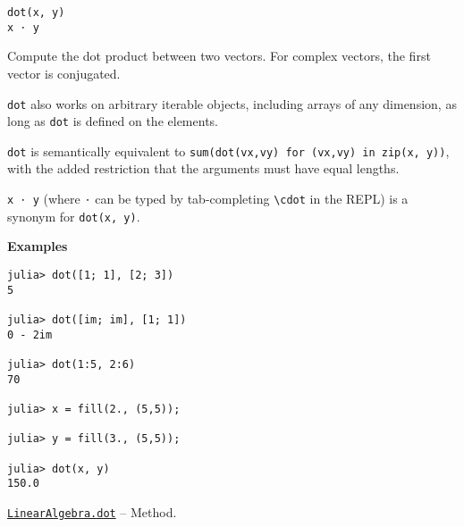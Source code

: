 \begin{adjustwidth}{2em}{0pt}


\begin{verbatim}
dot(x, y)
x ⋅ y
\end{verbatim}

Compute the dot product between two vectors. For complex vectors, the first vector is conjugated.

\texttt{dot} also works on arbitrary iterable objects, including arrays of any dimension, as long as \texttt{dot} is defined on the elements.

\texttt{dot} is semantically equivalent to \texttt{sum(dot(vx,vy) for (vx,vy) in zip(x, y))}, with the added restriction that the arguments must have equal lengths.

\texttt{x ⋅ y} (where \texttt{⋅} can be typed by tab-completing \texttt{{\textbackslash}cdot} in the REPL) is a synonym for \texttt{dot(x, y)}.

\textbf{Examples}


\begin{verbatim}
julia> dot([1; 1], [2; 3])
5

julia> dot([im; im], [1; 1])
0 - 2im

julia> dot(1:5, 2:6)
70

julia> x = fill(2., (5,5));

julia> y = fill(3., (5,5));

julia> dot(x, y)
150.0
\end{verbatim}



\end{adjustwidth}
\hypertarget{10928284914512325795}{}
\hyperlink{10928284914512325795}{\texttt{LinearAlgebra.dot}}  -- {Method.}

